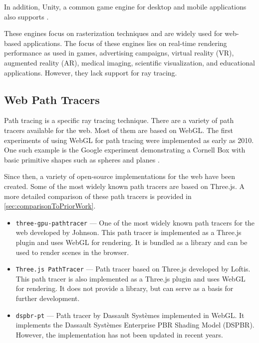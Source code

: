 In addition, \gls{Unity}, a common game engine for desktop and mobile applications also supports  \cite{unityWebGLCompatibility}.

These engines focus on rasterization techniques and are widely used for web-based applications. The focus of these engines lies on real-time rendering performance as used in games, advertising campaigns, virtual reality (VR), augmented reality (AR), medical imaging, scientific visualization, and educational applications. However, they lack support for ray tracing. 

\subsection*{Web Path Tracers}

Path tracing is a specific ray tracing technique. There are a variety of path tracers available for the web. Most of them are based on \gls{WebGL}. The first experiments of using \gls{WebGL} for path tracing were implemented as early as 2010. One such example is the Google experiment demonstrating a Cornell Box \cite{goral1984modeling} with basic primitive shapes such as spheres and planes \cite{pathTracerWallace}.

Since then, a variety of open-source implementations for the web have been created. Some of the most widely known path tracers are based on \gls{Three.js}. A more detailed comparison of these path tracers is provided in \autoref{sec:comparisonToPriorWork}.

\begin{itemize}
  \item{\texttt{three-gpu-pathtracer}} \cite{ThreeJsPathTracerJohnson} — One of the most widely known path tracers for the web developed by Johnson. This path tracer is implemented as a \gls{Three.js} plugin and uses \gls{WebGL} for rendering.  It is bundled as a library and can be used to render scenes in the browser.
  \item{\texttt{Three.js PathTracer}} \cite{ThreeJsPathTracerLoftis} — Path tracer based on \gls{Three.js} developed by Loftis. This path tracer is also implemented as a \gls{Three.js} plugin and uses \gls{WebGL} for rendering. It does not provide a library, but can serve as a basis for further development.
  \item{\texttt{dspbr-pt}} \cite{PathTracerDassault} — Path tracer by Dassault Systèmes implemented in \gls{WebGL}. It implements the Dassault Systèmes Enterprise PBR Shading Model (\gls{DSPBR}). However, the implementation has not been updated in recent years.
\end{itemize}

